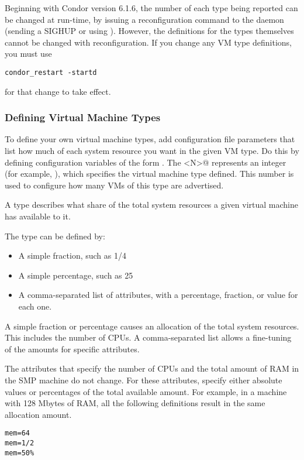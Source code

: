 Beginning with Condor version 6.1.6, the number of each type being
reported can be changed at run-time, by issuing a reconfiguration
command to
the  daemon (sending a SIGHUP or using ).
However, the definitions for the types themselves cannot be changed
with reconfiguration.
If you change any VM type definitions, you must use 
\begin{verbatim}
condor_restart -startd
\end{verbatim}
for that change to take effect.

\subsubsection{\label{sec:VM-Type-Define}
Defining Virtual Machine Types}

To define your own virtual machine types, add configuration file
parameters that list how much of each system resource you want in the
given VM type.  Do this by defining configuration
variables of the form
.
The \verb@<N>@ represents an integer (for example, 
), which specifies the virtual 
machine type defined.
This number is used to configure how many VMs of this type
are advertised.

A type describes what share of the total system resources a given
virtual machine has available to it.

The type can be defined by:
\begin{itemize}
  \item A simple fraction, such as 1/4
  \item A simple percentage, such as 25\Percent
  \item A comma-separated list of attributes, with a percentage,
	fraction, or value for each one.
\end{itemize}
A simple fraction or percentage causes an allocation
of the total system resources.
This includes the number of CPUs.
A comma-separated list allows a fine-tuning of
the amounts for specific attributes.

The attributes that specify the number of CPUs
and the total amount of RAM in
the SMP machine do not change.
For these attributes, specify either absolute values or
percentages of the total available amount.  
For example, in a machine with 128 Mbytes of RAM,
all the following definitions result in the same allocation amount.
\begin{verbatim}
mem=64
mem=1/2
mem=50%
\end{verbatim}

